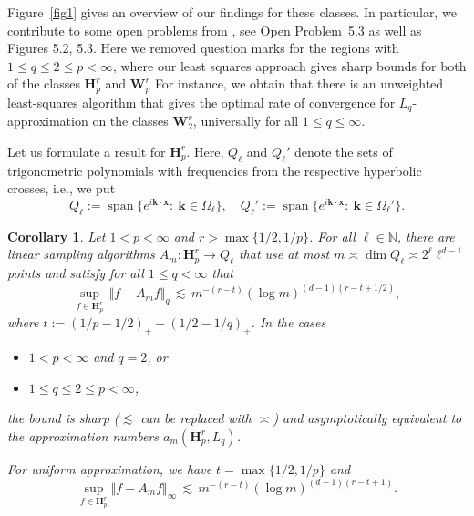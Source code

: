 \documentclass[a4paper,12pt]{amsart}
\newtheorem{corollary}[theorem]{Corollary}
\theoremstyle{definition}
\theoremstyle{remark}
\newcommand{\abs}[1]{\left|#1\right|}
\newcommand{\bk}{\mathbf{k}}
\newcommand{\bx}{\mathbf{x}}
\begin{document}
Figure~\ref{fig1} gives an overview of our findings for these classes.
{In particular, we contribute to some open problems from \cite{DTU18}, see Open Problem~5.3 as well as Figures 5.2, 5.3.
Here we removed question marks for the regions with $1\leq q\leq 2 \leq p< \infty$, where our least squares approach gives sharp bounds
for both of the classes
$\mathbf{H}^r_p$ and $\mathbf{W}^r_p$
}
For instance, we obtain that there is an unweighted least-squares algorithm that gives the optimal rate of convergence for $L_q$-approxi\-mation on the classes $\mathbf{W}^r_2$, universally for all $1\le q \le \infty$.
 
 
 

 {Let us formulate a result for $\mathbf{H}^r_p$.}
Here, 
$Q_\ell$ and $Q_\ell'$ denote 
the sets of trigonometric polynomials with frequencies from 
the respective
hyperbolic crosses, 
i.e.,
we put 
\begin{equation}\label{eq:Ql}
    Q_\ell := \operatorname{span} \{ e^{i \bk \cdot \bx } \colon \ \bk \in \Omega_\ell   \}, \quad Q_\ell' := \operatorname{span} \{ e^{i \bk \cdot \bx } \colon \ \bk \in \Omega_\ell'   \}.
\end{equation}


\medskip

\begin{corollary}\label{estim_nik-besov-classes}
Let $1<p<\infty$ and $r>\max \{1/2, 1/p\}$. For all $\ell\in\mathbb{N}$, there are linear sampling algorithms $A_m \colon \mathbf{H}^r_p \to Q_\ell$ %
that use at most 
$m \asymp \dim Q_\ell \asymp 2^\ell \ell^{d-1}$ points
and satisfy 
 {for all
$1\leq q 
<
\infty$} that
 $$
	\sup_{f\in{\mathbf{H}^r_p}}\, \Vert f - A_m f  \Vert_{q}
\,\lesssim\,  m^{-(r-t)}
(\log m)^{(d-1)\left(r-t+1/2\right)},
$$
where $t:=(1/p-1/2)_+ +(1/2-1/q)_+$.
{In the cases}
\begin{itemize}
    \item $1<p <\infty$ and $q=2$, or
    \item $1\leq q \leq2\leq p < \infty$,
\end{itemize}
the bound is sharp 
{($\lesssim$ can be replaced with $\asymp$) 
and asymptotically equivalent to the approximation numbers $a_m(\mathbf{H}^r_p, L_q)$.}

For 
uniform approximation, we have $t=\max\{1/2,1/p\}$ and
\[
 \sup_{f\in{\mathbf{H}^r_p}}\Vert f - A_m f  \Vert_\infty 
 \,\lesssim\, 	m^{-(r- t)} 
(\log m)^{(d-1)\left(r-t+ 1\right)}.
\]
\end{corollary}
\end{document}
